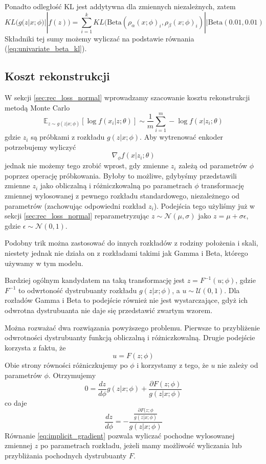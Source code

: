 \documentclass{iithesis}
\begin{document}
Ponadto odległość KL jest addytywna dla zmiennych niezależnych, zatem
\begin{equation*}
KL(g(z|x;\phi) || f(z)) = \sum_{i=1}^k
KL(\text{Beta}(\rho_\alpha(x;\phi)_i,\rho_\beta(x;\phi)_i) || \text{Beta}(0.01,0.01)
\end{equation*}
Składniki tej sumy możemy wyliczać na podstawie równania (\ref{eq:univariate_beta_kl}).

\subsection{Koszt rekonstrukcji} \label{sec:rec_loss_beta}
W sekcji \ref{sec:rec_loss_normal} wprowadzamy szacowanie kosztu rekonstrukcji metodą Monte Carlo
$$
\mathbb{E}_{z\sim g(z|x;\phi)}\left[\log f(x_i|z;\theta)\right] \sim
\frac{1}{m} \sum_{i=1}^m -\log f(x|z_i;\theta)
$$
gdzie $z_i$ są próbkami z rozkładu $g(z|x;\phi)$. Aby wytrenować enkoder potrzebujemy wyliczyć
$$
\nabla_\phi f(x|z_i;\theta)
$$
jednak nie możemy tego zrobić wprost, gdy zmienne $z_i$ zależą od parametrów $\phi$ poprzez
operację próbkowania. Byłoby to możliwe, gdybyśmy przedstawili zmienne $z_i$ jako
obliczalną i różniczkowalną po parametrach $\phi$ transformację
zmiennej wylosowanej z pewnego rozkładu standardowego, niezależnego od parametrów
(zachowując odpowiedni rozkład $z_i$). Podejścia tego użyliśmy już w sekcji \ref{sec:rec_loss_normal}
reparametryzując $z \sim \mathcal{N}(\mu, \sigma)$ jako $z=\mu + \sigma \epsilon$,
gdzie $\epsilon \sim \mathcal{N}(0, 1)$.

Podobny trik można zastosować do innych rozkładów z rodziny położenia i skali, niestety
jednak nie działa on z rozkładami takimi jak Gamma i Beta, którego używamy w tym modelu.

Bardziej ogólnym kandydatem na taką transformację jest $z = F^{-1}(u;\phi)$,
gdzie $F^{-1}$ to odwrtoność dystrubuanty rozkładu $g(z|x;\phi)$, a $u \sim \mathcal{U}(0, 1)$.
Dla rozładów Gamma i Beta to podejście również nie jest wystarczające, gdyż
ich odwrotna dystrubuanta nie daje się przedstawić zwartym wzorem.

Można rozważać dwa rozwiązania powyższego problemu. Pierwsze to przybliżenie
odwrotności dystrubuanty funkcją obliczalną i różniczkowalną.
Drugie podejście korzysta z faktu, że
$$
u = F(z;\phi)
$$
Obie strony równości różniczkujemy po $\phi$ i korzystamy z tego, że $u$ nie zależy od parametrów $\phi$.
Otrzymujemy
$$
0 = \frac{dz}{d\phi}g(z|x;\phi)+\frac{\partial F(z;\phi)}{g(z|x;\phi)}
$$
co daje
\begin{equation} \label{eq:implicit_gradient}
\frac{dz}{d\phi} = -\frac{\frac{\partial F(z;\phi}{g(z|x;\phi)}}{g(z|x;\phi)}
\end{equation}
Równanie \ref{eq:implicit_gradient} pozwala wyliczać pochodne wylosowanej zmiennej $z$
po parametrach rozkładu, jeżeli mamy możliwość wyliczania lub przybliżania pochodnych
dystrubuanty $F$.
\end{document}
